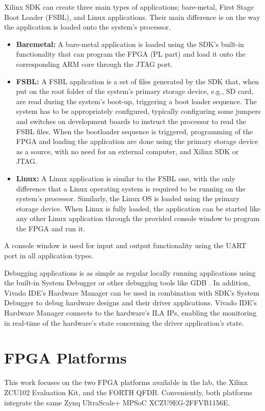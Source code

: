 Xilinx SDK can create three main types of applications; bare-metal, First Stage Boot Loader (FSBL), and Linux applications. Their main difference is on the way the application is loaded onto the system's processor.
\begin{itemize}
	\item \textbf{Baremetal:} A bare-metal application is loaded using the SDK's built-in functionality that can program the FPGA (PL part) and load it onto the corresponding ARM core through the JTAG port.
	\item \textbf{FSBL:} A FSBL application is a set of files generated by the SDK that, when put on the root folder of the system's primary storage device, e.g., SD card, are read during the system's boot-up, triggering a boot loader sequence. The system has to be appropriately configured, typically configuring some jumpers and switches on development boards to instruct the processor to read the FSBL files. When the bootloader sequence is triggered, programming of the FPGA and loading the application are done using the primary storage device as a source, with no need for an external computer, and Xilinx SDK or JTAG.
	\item \textbf{Linux:} A Linux application is similar to the FSBL one, with the only difference that a Linux operating system is required to be running on the system's processor. Similarly, the Linux OS is loaded using the primary storage device. When Linux is fully loaded, the application can be started like any other Linux application through the provided console window to program the FPGA and run it.
\end{itemize}
A console window is used for input and output functionality using the UART port in all application types.

Debugging applications is as simple as regular locally running applications using the built-in System Debugger or other debugging tools like GDB \cite{GDB}. In addition, Vivado IDE's Hardware Manager can be used in combination with SDK's System Debugger to debug hardware designs and their driver applications. Vivado IDE's Hardware Manager connects to the hardware's ILA IPs, enabling the monitoring in real-time of the hardware's state concerning the driver application's state.

\section{FPGA Platforms}
\label{sec:FPGA-Platforms}
This work focuses on the two FPGA platforms available in the lab, the Xilinx ZCU102 Evaluation Kit, and the FORTH QFDB. Conveniently, both platforms integrate the same Zynq UltraScale+ MPSoC XCZU9EG-2FFVB1156E.

